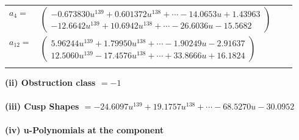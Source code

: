 \documentclass[1p]{elsarticle_modified}
\theoremstyle{definition}
\begin{document}
\begin{tabular}{m{7pt} m{180pt} m{7pt} m{180pt} }
\flushright $a_{4}=$&$\begin{pmatrix}-0.673830 u^{139}+0.601372 u^{138}+\cdots-14.0653 u+1.43963\\-12.6642 u^{139}+10.6942 u^{138}+\cdots-26.6036 u-15.5682\end{pmatrix}$ \\
\flushright $a_{12}=$&$\begin{pmatrix}5.96244 u^{139}+1.79950 u^{138}+\cdots-1.90249 u-2.91637\\12.5060 u^{139}-17.4576 u^{138}+\cdots+33.8666 u+16.1824\end{pmatrix}$\\&\end{tabular}
\flushleft \textbf{(ii) Obstruction class $= -1$}\\~\\
\flushleft \textbf{(iii) Cusp Shapes $= -24.6097 u^{139}+19.1757 u^{138}+\cdots-68.5270 u-30.0952$}\\~\\
\newpage\renewcommand{\arraystretch}{1}
\flushleft \textbf{(iv) u-Polynomials at the component}\newline \\
\end{document}
